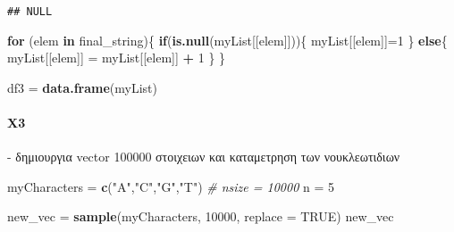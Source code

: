 \documentclass[
]{article}
\newenvironment{Shaded}{\begin{snugshade}}{\end{snugshade}}
\newcommand{\AttributeTok}[1]{\textcolor[rgb]{0.13,0.29,0.53}{#1}}
\newcommand{\CommentTok}[1]{\textcolor[rgb]{0.56,0.35,0.01}{\textit{#1}}}
\newcommand{\ConstantTok}[1]{\textcolor[rgb]{0.56,0.35,0.01}{#1}}
\newcommand{\ControlFlowTok}[1]{\textcolor[rgb]{0.13,0.29,0.53}{\textbf{#1}}}
\newcommand{\DecValTok}[1]{\textcolor[rgb]{0.00,0.00,0.81}{#1}}
\newcommand{\FunctionTok}[1]{\textcolor[rgb]{0.13,0.29,0.53}{\textbf{#1}}}
\newcommand{\NormalTok}[1]{#1}
\newcommand{\OtherTok}[1]{\textcolor[rgb]{0.56,0.35,0.01}{#1}}
\newcommand{\SpecialCharTok}[1]{\textcolor[rgb]{0.81,0.36,0.00}{\textbf{#1}}}
\newcommand{\StringTok}[1]{\textcolor[rgb]{0.31,0.60,0.02}{#1}}
\begin{document}
\begin{verbatim}
## NULL
\end{verbatim}

\begin{Shaded}
\begin{Highlighting}[]
\ControlFlowTok{for}\NormalTok{ (elem }\ControlFlowTok{in}\NormalTok{ final\_string)\{ }
  \ControlFlowTok{if}\NormalTok{(}\FunctionTok{is.null}\NormalTok{(myList[[elem]]))\{ }
\NormalTok{    myList[[elem]]}\OtherTok{=}\DecValTok{1}
\NormalTok{  \} }
  \ControlFlowTok{else}\NormalTok{\{}
\NormalTok{      myList[[elem]] }\OtherTok{=}\NormalTok{ myList[[elem]] }\SpecialCharTok{+} \DecValTok{1} 
\NormalTok{  \} }
\NormalTok{\}}

\NormalTok{df3 }\OtherTok{=} \FunctionTok{data.frame}\NormalTok{(myList)}
\end{Highlighting}
\end{Shaded}

\paragraph{Χ3}\label{ux3c73}

- δημιουργια vector 100000 στοιχειων και καταμετρηση των νουκλεωτιδιων

\begin{Shaded}
\begin{Highlighting}[]
\NormalTok{myCharacters }\OtherTok{=} \FunctionTok{c}\NormalTok{(}\StringTok{"A"}\NormalTok{,}\StringTok{"C"}\NormalTok{,}\StringTok{"G"}\NormalTok{,}\StringTok{"T"}\NormalTok{)}
\CommentTok{\# nsize = 10000}
\NormalTok{n }\OtherTok{=} \DecValTok{5}


\NormalTok{new\_vec }\OtherTok{=} \FunctionTok{sample}\NormalTok{(myCharacters, }\DecValTok{10000}\NormalTok{, }\AttributeTok{replace =} \ConstantTok{TRUE}\NormalTok{)}
\NormalTok{new\_vec}
\end{Highlighting}
\end{Shaded}
\end{document}
